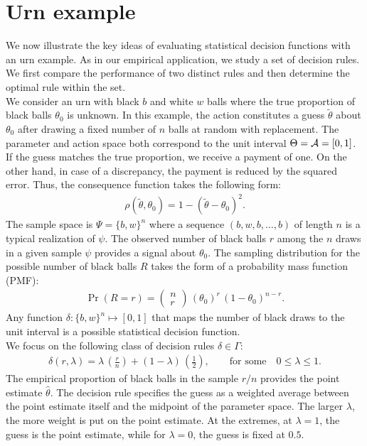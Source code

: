\section{Urn example}
We now illustrate the key ideas of evaluating statistical decision functions with an urn example. As in our empirical application, we study a set of decision rules. We first compare the performance of two distinct rules and then determine the optimal rule within the set.\\

We consider an urn with black $b$ and white $w$ balls where the true proportion of black balls $\theta_0$ is unknown. In this example, the action constitutes a guess $\tilde{\theta}$ about $\theta_0$ after drawing a fixed number of $n$ balls at random with replacement. The parameter and action space both correspond to the unit interval $\Theta = \mathcal{A} = [0, 1]$. \\

If the guess matches the true proportion, we receive a payment of one. On the other hand, in case of a discrepancy, the payment is reduced by the squared error. Thus, the consequence function takes the following form:
%
\begin{align*}
\rho(\tilde{\theta}, \theta_0) = 1 - (\tilde{\theta} - \theta_0)^2.
\end{align*}
%
The sample space is $\Psi = \{b, w\}^n$ where a sequence $(b, w, b, \hdots, b)$ of length $n$ is a typical realization of $\psi$. The observed number of black balls $r$ among the $n$ draws in a given sample $\psi$ provides a signal about $\theta_0$. The sampling distribution for the possible number of black balls $R$ takes the form of a probability mass function (PMF):
%
\begin{align*}
\Pr(R = r) = \left(\begin{array}{c} n \\ r \end{array} \right)\, (\theta_0)^r\, (1 - \theta_0)^{n-r}.
\end{align*}
%
Any function $\delta:  \{b, w\}^n \mapsto [0, 1]$ that maps the number of black draws to the unit interval is a possible statistical decision function.\\

We focus on the following class of decision rules $\delta \in \Gamma$:
%
\begin{align*}
 \delta(r, \lambda) = \lambda\,\left(\frac{r}{n}\right)  + (1 - \lambda)\,\left(\frac{1}{2}\right),\qquad\text{for some}\quad 0 \leq \lambda \leq 1.
\end{align*}
%
The empirical proportion of black balls in the sample $r / n$ provides the point estimate $\hat{\theta}$. The decision rule specifies the guess as a weighted average between the point estimate itself and the midpoint of the parameter space. The larger $\lambda$, the more weight is put on the point estimate. At the extremes, at $\lambda = 1$, the guess is the point estimate, while for $\lambda = 0$, the guess is fixed at $0.5$.\\

